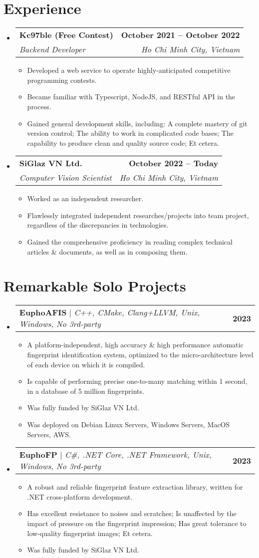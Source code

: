 \documentclass[letterpaper,11pt]{article}
\makeatletter
\newcommand{\resumeItem}[1]{
\item\small{
{#1 \vspace{-2pt}}
}
}
\newcommand{\resumeSubheading}[4]{
\vspace{-2pt}\item
\begin{tabular*}{1.0\textwidth}[t]{l@{\extracolsep{\fill}}r}
\textbf{#1} & \textbf{\small #2} \\
\textit{\small#3} & \textit{\small #4} \\
    \end{tabular*}\vspace{-7pt}
}
\newcommand{\resumeProjectHeading}[2]{
\item
\begin{tabular*}{1.001\textwidth}{l@{\extracolsep{\fill}}r}
\small#1 & \textbf{\small #2}\\
\end{tabular*}\vspace{-7pt}
}
\newcommand{\resumeSubHeadingListStart}{\begin{itemize}[leftmargin=0.0in, label={}]}
\newcommand{\resumeSubHeadingListEnd}{\end{itemize}}
\newcommand{\resumeItemListStart}{\begin{itemize}}
\newcommand{\resumeItemListEnd}{\end{itemize}\vspace{-5pt}}
\makeatother
\begin{document}
\section{Experience}
\resumeSubHeadingListStart

\resumeSubheading
{Kc97ble (Free Contest)}{October 2021 -- October 2022}
{Backend Developer}{Ho Chi Minh City, Vietnam}
\resumeItemListStart
\resumeItem{Developed a web service to operate highly-anticipated competitive programming contests.}
\resumeItem{Became familiar with Typescript, NodeJS, and RESTful API in the process.}
\resumeItem{Gained general development skills, including: A complete mastery of git version control; The ability to work in complicated code bases; The capability to produce clean and quality source code; Et cetera.}
\resumeItemListEnd

\resumeSubheading
{SiGlaz VN Ltd.}{October 2022 -- Today}
{Computer Vision Scientist}{Ho Chi Minh City, Vietnam}
\resumeItemListStart
\resumeItem{Worked as an independent researcher.}
\resumeItem{Flawlessly integrated independent researches/projects into team project, regardless of the discrepancies in technologies.}
\resumeItem{Gained the comprehensive proficiency in reading complex technical articles \& documents, as well as in composing them.}
\resumeItemListEnd

\resumeSubHeadingListEnd
\vspace{-16pt}


\section{Remarkable Solo Projects}
\vspace{-5pt}
\resumeSubHeadingListStart
\resumeProjectHeading
{\textbf{EuphoAFIS} $|$ \emph{C++, CMake, Clang+LLVM, Unix, Windows, No 3rd-party}}{2023}
\resumeItemListStart
\resumeItem{A platform-independent, high accuracy \& high performance automatic fingerprint identification system, optimized to the micro-architecture level of each device on which it is compiled.}
\resumeItem{Is capable of performing precise one-to-many matching within 1 second, in a database of 5 million fingerprints.}
\resumeItem{Was fully funded by SiGlaz VN Ltd.}
\resumeItem{Was deployed on Debian Linux Servers, Windows Servers, MacOS Servers, AWS.}
\resumeItemListEnd
\vspace{-13pt}
\resumeProjectHeading
{\textbf{EuphoFP} $|$ \emph{C\#, .NET Core, .NET Framework, Unix, Windows, No 3rd-party}}{2023}
\resumeItemListStart
\resumeItem{A robust and reliable fingerprint feature extraction library, written for .NET cross-platform development.}
\resumeItem{Has excellent resistance to noises and scratches; Is unaffected by the impact of pressure on the fingerprint impression; Has great tolerance to low-quality fingerprint images; Et cetera.}
\resumeItem{Was fully funded by SiGlaz VN Ltd.}
\resumeItemListEnd
\resumeSubHeadingListEnd
\vspace{-15pt}
\end{document}
